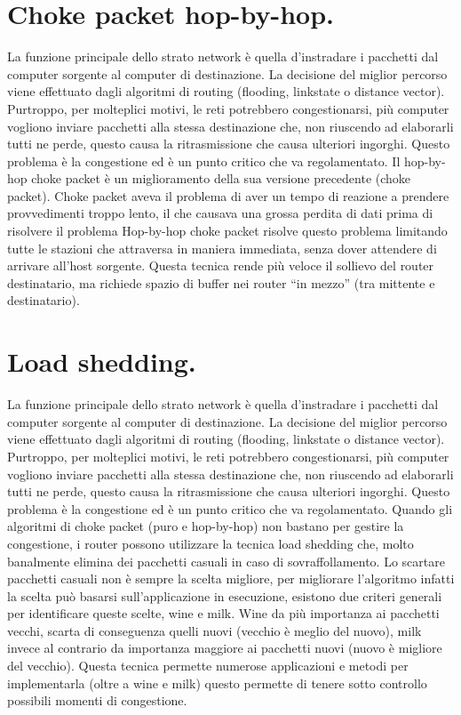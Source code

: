 \section{Choke packet hop-by-hop.}

La funzione principale dello strato network è quella d’instradare i pacchetti dal computer sorgente al computer di destinazione. La decisione del miglior percorso viene effettuato dagli algoritmi di routing (flooding, linkstate o distance vector). Purtroppo, per molteplici motivi, le reti potrebbero congestionarsi, più computer vogliono inviare pacchetti alla stessa destinazione che, non riuscendo ad elaborarli tutti ne perde, questo causa la ritrasmissione che causa ulteriori ingorghi. Questo problema è la congestione ed è un punto critico che va regolamentato.
Il hop-by-hop choke packet è un miglioramento della sua versione precedente (choke packet).
Choke packet aveva il problema di aver un tempo di reazione a prendere provvedimenti troppo lento, il che causava una grossa perdita di dati prima di risolvere il problema
Hop-by-hop choke packet risolve questo problema limitando tutte le stazioni che attraversa in maniera immediata, senza dover attendere di arrivare all’host sorgente.
Questa tecnica rende più veloce il sollievo del router destinatario, ma richiede spazio di buffer nei router “in mezzo” (tra mittente e destinatario).
 
\section{Load shedding.}

La funzione principale dello strato network è quella d’instradare i pacchetti dal computer sorgente al computer di destinazione. La decisione del miglior percorso viene effettuato dagli algoritmi di routing (flooding, linkstate o distance vector). Purtroppo, per molteplici motivi, le reti potrebbero congestionarsi, più computer vogliono inviare pacchetti alla stessa destinazione che, non riuscendo ad elaborarli tutti ne perde, questo causa la ritrasmissione che causa ulteriori ingorghi. Questo problema è la congestione ed è un punto critico che va regolamentato.
Quando gli algoritmi di choke packet (puro e hop-by-hop) non bastano per gestire la congestione, i router possono utilizzare la tecnica load shedding che, molto banalmente elimina dei pacchetti casuali in caso di sovraffollamento.
Lo scartare pacchetti casuali non è sempre la scelta migliore, per migliorare l’algoritmo infatti la scelta può basarsi sull’applicazione in esecuzione, esistono due criteri generali per identificare queste scelte, wine e milk.
Wine da più importanza ai pacchetti vecchi, scarta di conseguenza quelli nuovi (vecchio è meglio del nuovo), milk invece al contrario da importanza maggiore ai pacchetti nuovi (nuovo è migliore del vecchio).
Questa tecnica permette numerose applicazioni e metodi per implementarla (oltre a wine e milk) questo permette di tenere sotto controllo possibili momenti di congestione.

